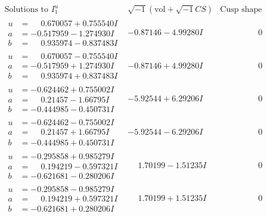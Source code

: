 \documentclass[1p]{elsarticle_modified}
\theoremstyle{definition}
\newcommand{\I}{\sqrt{-1}}
\begin{document}
$$\begin{array}{c|c|c}  
\text{Solutions to }I^u_{1}& \I (\text{vol} + \sqrt{-1}CS) & \text{Cusp shape}\\
 \hline 
\begin{aligned}
u &= \phantom{-}0.670057 + 0.755540 I \\
a &= -0.517959 - 1.274930 I \\
b &= \phantom{-}0.935974 - 0.837483 I\end{aligned}
 & -0.87146 - 4.99280 I & \phantom{-0.000000 } 0 \\ \hline\begin{aligned}
u &= \phantom{-}0.670057 - 0.755540 I \\
a &= -0.517959 + 1.274930 I \\
b &= \phantom{-}0.935974 + 0.837483 I\end{aligned}
 & -0.87146 + 4.99280 I & \phantom{-0.000000 } 0 \\ \hline\begin{aligned}
u &= -0.624462 + 0.755002 I \\
a &= \phantom{-}0.21457 - 1.66795 I \\
b &= -0.444985 - 0.450731 I\end{aligned}
 & -5.92544 + 6.29206 I & \phantom{-0.000000 } 0 \\ \hline\begin{aligned}
u &= -0.624462 - 0.755002 I \\
a &= \phantom{-}0.21457 + 1.66795 I \\
b &= -0.444985 + 0.450731 I\end{aligned}
 & -5.92544 - 6.29206 I & \phantom{-0.000000 } 0 \\ \hline\begin{aligned}
u &= -0.295858 + 0.985279 I \\
a &= \phantom{-}0.194219 - 0.597321 I \\
b &= -0.621681 - 0.280206 I\end{aligned}
 & \phantom{-}1.70199 - 1.51235 I & \phantom{-0.000000 } 0 \\ \hline\begin{aligned}
u &= -0.295858 - 0.985279 I \\
a &= \phantom{-}0.194219 + 0.597321 I \\
b &= -0.621681 + 0.280206 I\end{aligned}
 & \phantom{-}1.70199 + 1.51235 I & \phantom{-0.000000 } 0 \\ \hline\begin{aligned}

\end{aligned}
\end{array}$$
\end{document}
